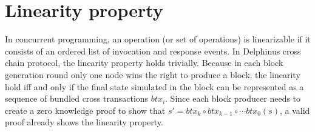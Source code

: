 \documentclass[acmtog, natbib=false]{acmart}
\begin{document}
\section{Linearity property}
In concurrent programming, an operation (or set of operations) is linearizable if it consists of an ordered list of invocation and response events. In Delphinus cross chain protocol, the linearity property holds trivially. Because in each block generation round only one node wins the right to produce a block, the linearity hold iff and only if the final state simulated in the block can be represented as a sequence of bundled cross transactions $btx_i$. Since each block producer needs to create a zero knowledge proof to show that $s' = btx_k \circ btx_{k-1} \circ \cdots btx_0(s)$, a valid proof already shows the linearity property.


\printbibliography
\appendix
\end{document}
